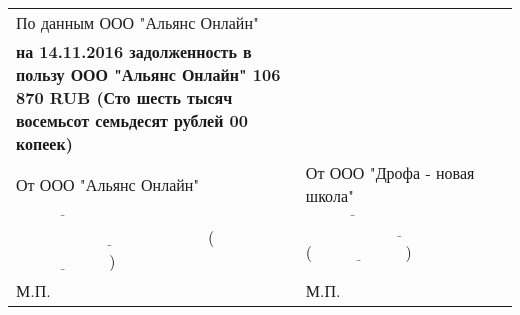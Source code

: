 \documentclass[a4paper,10pt]{article}
\begin{document}
\begin{longtable}{p{250pt}p{250pt}}
По данным ООО "Альянс Онлайн" & \\
\textbf{на 14.11.2016 задолженность в пользу ООО "Альянс Онлайн" 106 870 RUB (Сто шесть тысяч восемьсот семьдесят рублей 00 копеек) } & \\
От ООО "Альянс Онлайн" & От ООО "Дрофа - новая школа"\\
$\underset{\text{}}{\underline{\hspace{70pt}}}$ & $\underset{\text{}}{\underline{\hspace{70pt}}}$\\
$\underset{\text{}}{\underline{\hspace{140pt}}}$ ($\underset{\text{}}{\underline{\hspace{70pt}}}$) & $\underset{\text{}}{\underline{\hspace{140pt}}}$ ($\underset{\text{}}{\underline{\hspace{70pt}}}$) \\
М.П. & М.П. \\
\end{longtable}
\end{document}
